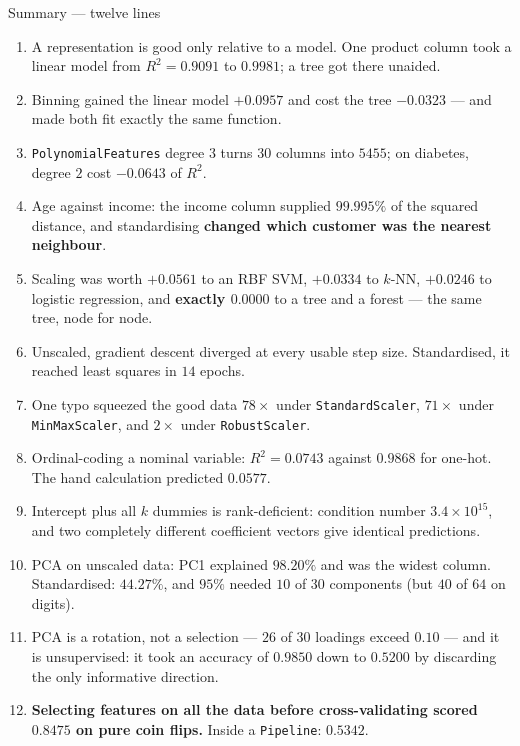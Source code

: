 \documentclass[aspectratio=169]{beamer}
\begin{document}
\begin{frame}[shrink=15]{Summary --- twelve lines}
  \begin{enumerate}\small
    \item A representation is good only relative to a model. One product
      column took a linear model from $R^2 = 0.9091$ to $0.9981$; a tree got
      there unaided.
    \item Binning gained the linear model $+0.0957$ and cost the tree
      $-0.0323$ --- and made both fit exactly the same function.
    \item \texttt{PolynomialFeatures} degree $3$ turns $30$ columns into
      $5455$; on diabetes, degree $2$ cost $-0.0643$ of $R^2$.
    \item Age against income: the income column supplied $99.995\%$ of the
      squared distance, and standardising \textbf{changed which customer was
      the nearest neighbour}.
    \item Scaling was worth $+0.0561$ to an RBF SVM, $+0.0334$ to $k$-NN,
      $+0.0246$ to logistic regression, and \textbf{exactly $0.0000$} to a
      tree and a forest --- the same tree, node for node.
    \item Unscaled, gradient descent diverged at every usable step size.
      Standardised, it reached least squares in $14$ epochs.
    \item One typo squeezed the good data $78\times$ under
      \texttt{StandardScaler}, $71\times$ under \texttt{MinMaxScaler}, and
      $2\times$ under \texttt{RobustScaler}.
    \item Ordinal-coding a nominal variable: $R^2 = 0.0743$ against $0.9868$
      for one-hot. The hand calculation predicted $0.0577$.
    \item Intercept plus all $k$ dummies is rank-deficient: condition number
      $3.4\times10^{15}$, and two completely different coefficient vectors
      give identical predictions.
    \item PCA on unscaled data: PC1 explained $98.20\%$ and was the widest
      column. Standardised: $44.27\%$, and $95\%$ needed $10$ of $30$
      components (but $40$ of $64$ on digits).
    \item PCA is a rotation, not a selection --- $26$ of $30$ loadings exceed
      $0.10$ --- and it is unsupervised: it took an accuracy of $0.9850$ down
      to $0.5200$ by discarding the only informative direction.
    \item \textbf{Selecting features on all the data before cross-validating
      scored $0.8475$ on pure coin flips.} Inside a \texttt{Pipeline}:
      $0.5342$.
  \end{enumerate}
\end{frame}
\end{document}
